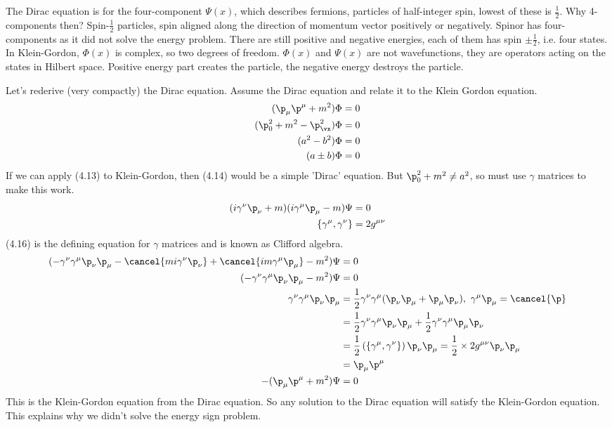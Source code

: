 \documentclass[a4paper, 11pt, normalem]{report}
\newcommand{\fp}{\cancel{\p}}
\begin{document}
The Dirac equation is for the four-component $\Psi(x)$, which describes fermions, particles of half-integer spin, lowest of these is $\frac12$.
Why 4-components then?
Spin-$\frac12$ particles, spin aligned along the direction of momentum vector positively or negatively.
Spinor has four-components as it did not solve the energy problem. 
There are still positive and negative energies, each of them has spin $\pm\frac12$, i.e. four states.\\
In Klein-Gordon, $\Phi(x)$ is complex, so two degrees of freedom.
$\Phi(x)$ and $\Psi(x)$ are not wavefunctions, they are operators acting on the states in Hilbert space.
Positive energy part creates the particle, the negative energy destroys the particle.

Let's rederive (very compactly) the Dirac equation.
Assume the Dirac equation and relate it to the Klein Gordon equation.
\begin{align}
    (\p_\mu\p^\mu + m^2)\Phi &= 0 \\
    (\p_0^2 + m^2 - \p_{\vx}^2)\Phi &= 0 \\
    (a^2 - b^2)\Phi &= 0 \\
    (a \pm b)\Phi &= 0 
\end{align}
If we can apply (4.13) to Klein-Gordon, then (4.14) would be a simple 'Dirac' equation.
But $\p_0^2 + m^2 \neq a^2$, so must use $\gamma$ matrices to make this work. 
\begin{align}
    (i\gamma^\nu\p_\nu + m)(i\gamma^\mu\p_\mu - m)\Psi &= 0 \\ 
    \{\gamma^\mu,\gamma^\nu\} &= 2g^{\mu\nu}
\end{align}
(4.16) is the defining equation for $\gamma$ matrices and is known as Clifford algebra.
\begin{align}
    (-\gamma^\nu\gamma^\mu\p_\nu\p_\mu - \cancel{mi\gamma^\nu\p_\nu} + \cancel{im\gamma^\mu\p_\mu} - m^2)\Psi &= 0 \\
    (-\gamma^\nu\gamma^\mu\p_\nu\p_\mu - m^2)\Psi &= 0 \\
    \gamma^\nu\gamma^\mu \p_\nu\p_\mu &= \frac12\gamma^\nu\gamma^\mu(\p_\nu\p_\mu + \p_\mu\p_\nu),~ \gamma^\mu\p_\mu = \fp \\
                                      &= \frac12\gamma^\nu\gamma^\mu\p_\nu\p_\mu + \frac12\gamma^\nu\gamma^\mu\p_\mu\p_\nu \\
                                      &= \frac12\left(\{\gamma^\mu,\gamma^\nu\}\right)\p_\nu\p_\mu = \frac12\times 2g^{\mu\nu}\p_\nu\p_\mu \\
                                      &= \p_\mu\p^\mu \\
    -(\p_\mu\p^\mu + m^2)\Psi &= 0
\end{align}
This is the Klein-Gordon equation from the Dirac equation.
So any solution to the Dirac equation will satisfy the Klein-Gordon equation. 
This explains why we didn't solve the energy sign problem.
\end{document}
